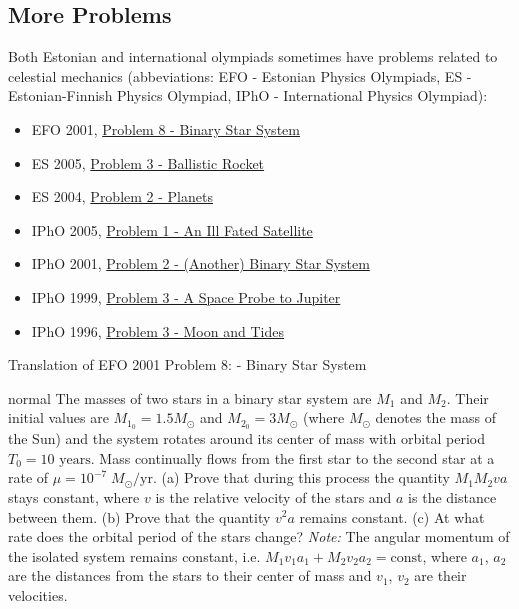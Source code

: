 \documentclass[11pt]{article}
\begin{document}
\subsection{More Problems}
\vspace{-2mm}
Both Estonian and international olympiads sometimes have problems related to celestial mechanics (abbeviations: EFO - Estonian Physics Olympiads, ES - Estonian-Finnish Physics Olympiad, IPhO - International Physics Olympiad):
\begin{itemize}
    \item EFO 2001, \href{https://www.teaduskool.ut.ee/sites/default/files/teaduskool/olympiaad/eesti/efo_01_02_lv_ylesanded_g_ee.pdf}{Problem 8 - Binary Star System}
    \item ES 2005, \href{https://www.ioc.ee/~kalda/ipho/es/E_S_2005_e.pdf}{Problem 3 - Ballistic Rocket}
    \item ES 2004, \href{https://www.ioc.ee/~kalda/ipho/E_S2.pdf}{Problem 2 - Planets}
    \item IPhO 2005, \href{https://www.ioc.ee/~kree/students/iphoTable/files/ipho/2005_Spain_p1.pdf}{Problem 1 - An Ill Fated Satellite}
    \item IPhO 2001, \href{https://www.ioc.ee/~kree/students/iphoTable/files/ipho/2001_Turkey_p2.pdf}{Problem 2 - (Another) Binary Star System}
    \item IPhO 1999, \href{https://www.ioc.ee/~kree/students/iphoTable/files/ipho/1999_Italy_p3.pdf}{Problem 3 - A Space Probe to Jupiter}
    \item IPhO 1996, \href{https://www.ioc.ee/~kree/students/iphoTable/files/ipho/1996_Norway_p3.pdf}{Problem 3 - Moon and Tides}
\end{itemize}
Translation of EFO 2001 Problem 8: - Binary Star System
\hypertarget{P11}{}
\begin{solution}{normal}
The masses of two stars in a binary star system are $M_1$ and $M_2$. Their initial values are $M_{1_0}=1.5M_{\odot}$ and $M_{2_0}=3M_{\odot}$ (where $M_\odot$ denotes the mass of the Sun) and the system rotates around its center of mass with orbital period $T_0=10\text{ years}$. Mass continually flows from the first star to the second star at a rate of $\mu=10^{-7}\;M_\odot/\text{yr}$. (a) Prove that during this process the quantity $M_1M_2va$ stays constant, where $v$ is the relative velocity of the stars and $a$ is the distance between them. (b) Prove that the quantity $v^2a$ remains constant. (c) At what rate does the orbital period of the stars change? \textit{Note:} The angular momentum of the isolated system remains constant, i.e. $M_1v_1a_1+M_2v_2a_2=\text{const}$, where $a_1$, $a_2$ are the distances from the stars to their center of mass and $v_1$, $v_2$ are their velocities.
\end{solution}
\vspace{-5mm}
\end{document}
